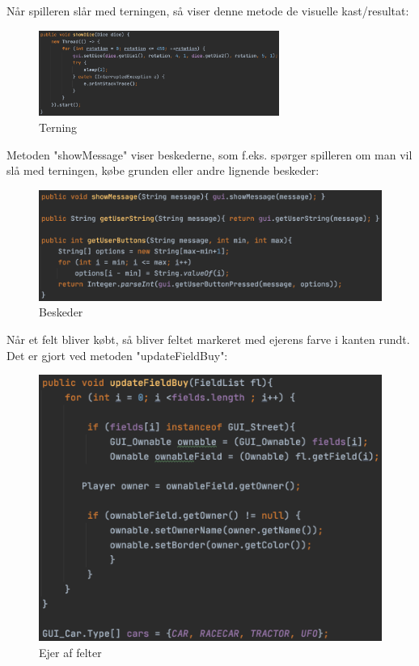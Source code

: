 Når spilleren slår med terningen, så viser denne metode de visuelle kast/resultat:
\begin{figure}[H]
    \centering
    \includegraphics[width=0.7\textwidth]{sources/7_implementering/GameGUIshowDice.png}
    \caption{Terning}
    \label{fig:GUIterning}
\end{figure}
Metoden "showMessage" viser beskederne, som f.eks. spørger spilleren om man vil slå med terningen, købe grunden eller andre lignende beskeder:
\begin{figure}[H]
    \centering
    \includegraphics{sources/7_implementering/GameGUIshowMessage.png}
    \caption{Beskeder}
    \label{fig:GUIbeskeder}
\end{figure}
Når et felt bliver købt, så bliver feltet markeret med ejerens farve i kanten rundt. Det er gjort ved metoden "updateFieldBuy":
\begin{figure}[H]
    \centering
    \includegraphics{sources/7_implementering/GameGUIupdateFieldBuy.png}
    \caption{Ejer af felter}
    \label{fig:GUIfeltEjer}
\end{figure}

